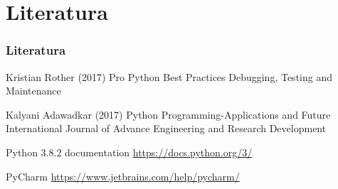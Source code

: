 \documentclass{beamer}
\begin{document}
\section{Literatura}
\begin{frame}
\frametitle{Literatura}
\footnotesize{
\begin{thebibliography}{} %
 Kristian Rother (2017)
\newblock Pro Python Best Practices Debugging, Testing and Maintenance

 Kalyani Adawadkar (2017)
\newblock Python Programming-Applications and Future
\newblock International Journal of Advance Engineering and Research Development

 Python 3.8.2 documentation
\newblock \url{https://docs.python.org/3/}

 PyCharm
\newblock \url{https://www.jetbrains.com/help/pycharm/}
\end{thebibliography}
}

\end{frame}



\end{document}
